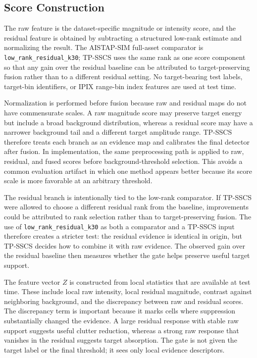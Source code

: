 \documentclass[journal]{IEEEtran}
\begin{document}
\subsection{Score Construction}

The raw feature is the dataset-specific magnitude or intensity score, and the residual feature is obtained by subtracting a structured low-rank estimate and normalizing the result. The AISTAP-SIM full-asset comparator is \texttt{low\_rank\_residual\_k30}; TP-SSCS uses the same rank as one score component so that any gain over the residual baseline can be attributed to target-preserving fusion rather than to a different residual setting. No target-bearing test labels, target-bin identifiers, or IPIX range-bin index features are used at test time.

Normalization is performed before fusion because raw and residual maps do not have commensurate scales. A raw magnitude score may preserve target energy but include a broad background distribution, whereas a residual score may have a narrower background tail and a different target amplitude range. TP-SSCS therefore treats each branch as an evidence map and calibrates the final detector after fusion. In implementation, the same preprocessing path is applied to raw, residual, and fused scores before background-threshold selection. This avoids a common evaluation artifact in which one method appears better because its score scale is more favorable at an arbitrary threshold.

The residual branch is intentionally tied to the low-rank comparator. If TP-SSCS were allowed to choose a different residual rank from the baseline, improvements could be attributed to rank selection rather than to target-preserving fusion. The use of \texttt{low\_rank\_residual\_k30} as both a comparator and a TP-SSCS input therefore creates a stricter test: the residual evidence is identical in origin, but TP-SSCS decides how to combine it with raw evidence. The observed gain over the residual baseline then measures whether the gate helps preserve useful target support.

The feature vector $Z$ is constructed from local statistics that are available at test time. These include local raw intensity, local residual magnitude, contrast against neighboring background, and the discrepancy between raw and residual scores. The discrepancy term is important because it marks cells where suppression substantially changed the evidence. A large residual response with stable raw support suggests useful clutter reduction, whereas a strong raw response that vanishes in the residual suggests target absorption. The gate is not given the target label or the final threshold; it sees only local evidence descriptors.
\end{document}
